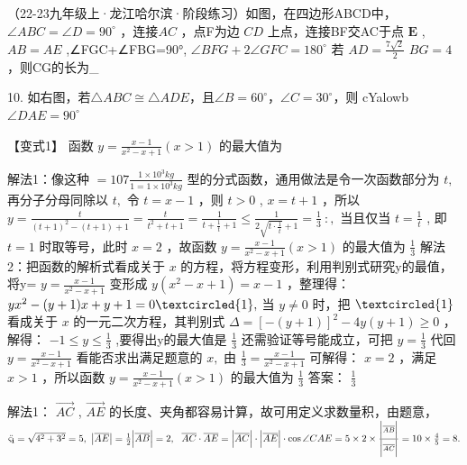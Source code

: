 \documentclass[12pt, a4paper, addpoints]{exam} %
\begin{document}
\begin{questions}
（22-23九年级上·龙江哈尔滨·阶段练习）如图，在四边形ABCD中，
$\angle A B C = \angle D = 9 0 ^ { \circ }$ ，连接$A C$ ，点F为边
$C D$ 上点，连接BF交AC于点 $\boldsymbol { E }$ , $A B = A E$
,∠FGC+∠FBG=90°, $\angle B F G + 2 \angle G F C = 1 8 0 ^ { \circ }$ 若
$AD=\frac{7\sqrt{2}} { 2 }$ $BG=4$ ，则CG的长为\_



\vspace{6cm}

10. 如右图，若$\triangle{ABC}\cong\triangle{ADE}$，且$\angle{B}=60^{\circ}$，$\angle{C}=30^{\circ}$，则 cYalowb $\angle D A E = 90 ^ { \circ }$
\vspace{6cm}

【变式1】 函数 $y = { \frac { x - 1 } { x ^ { 2 } - x + 1 } } ( x > 1 )$ 的最大值为

解法1：像这种 $= 10 7 \frac { 1 \times 10 ^ { 3 } k g } { 1 = 1 \times 10 ^ { 3 } k g }$ 型的分式函数，通用做法是令一次函数部分为 $t ,$ 再分子分母同除以 $t ,$ 令 $t = x - 1$ ，则 $t > 0$ , $x = t + 1$ ，所以 $y = \frac { t } { \left( t + 1 \right) ^ { 2 } - \left( t + 1 \right) + 1 } = \frac { t } { t ^ { 2 } + t + 1 } = \frac { 1 } { t + \frac { 1 } { t } + 1 } \leq \frac { 1 } { 2 \sqrt { t \cdot \frac { 1 } { t } } + 1 } = \frac { 1 } { 3 } \ : ,$ 当且仅当 $t = { \frac { 1 } { t } }$ , 即 $t = 1$ 时取等号，此时 $x = 2$ ，故函数 $y = { \frac { x - 1 } { x ^ { 2 } - x + 1 } } ( x > 1 )$ 的最大值为 $\frac 13$ 解法2：把函数的解析式看成关于 $x$ 的方程，将方程变形，利用判别式研究y的最值，将y= $y = { \frac { x - 1 } { x ^ { 2 } - x + 1 } }$ 变形成 $y ( x ^ { 2 } - x + 1 ) = x - 1$ ，整理得： $y x ^ { 2 } - ( y + 1 ) x + y + 1 = 0 \textcircled { 1 } ,$ 当 $y \neq 0$ 时，把 $\textcircled{1}$ 看成关于 $x$ 的一元二次方程，其判别式 $\Delta = [ - ( y + 1 ) ] ^ { 2 } - 4 y ( y + 1 ) \geq 0$ ，解得： $- 1 \leq y \leq \frac { 1 } { 3 }$ ,要得出y的最大值是 $\frac 13$ 还需验证等号能成立，可把 $y = \frac 13$ 代回 $y = { \frac { x - 1 } { x ^ { 2 } - x + 1 } }$ 看能否求出满足题意的 $x ,$ 由 $\frac { 1 } { 3 } = \frac { x - 1 } { { x } ^ { 2 } - x + 1 }$ 可解得： $x = 2$ ，满足 $x > 1$ ，所以函数 $y = { \frac { x - 1 } { x ^ { 2 } - x + 1 } } ( x > 1 )$ 的最大值为 $\frac 13$ 答案： $\frac 13$

\vspace{6cm}

解法1： $\overrightarrow { A C }$ , $\overrightarrow { A E }$ 的长度、夹角都容易计算，故可用定义求数量积，由题意， $\ddot { \varsigma _ { \bf i } } = \sqrt { 4 ^ { 2 } + 3 ^ { 2 } } = 5 , \ \left| \overline { { { A E } } } \right| = \frac { 1 } { 2 } \Big | \overline { { { A B } } } \Big | = 2 , \ \ \overline { { { A C } } } \cdot \overline { { { A E } } } = \Big | \overline { { { A C } } } \Big | \cdot \Big | \overline { { { A E } } } \Big | \cdot \cos \angle C A E = 5 \times 2 \times \frac { \Big | \overline { { { A B } } } \Big | } { \Big | \overline { { { A C } } } \Big | } = 10 \times \frac { 4 } { 5 } = 8 . $



\end{questions}
\endgroup
\end{document}
